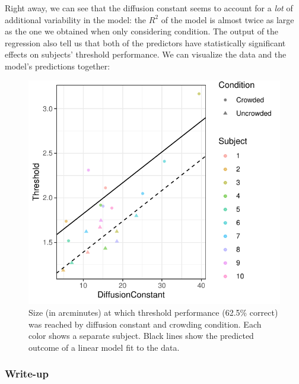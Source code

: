 \documentclass[
]{article}
\begin{document}
\normalsize

Right away, we can see that the diffusion constant seems to account for
a \emph{lot} of additional variability in the model: the \(R^2\) of the
model is almost twice as large as the one we obtained when only
considering condition. The output of the regression also tell us that
both of the predictors have statistically significant effects on
subjects' threshold performance. We can visualize the data and the
model's predictions together:

\footnotesize

\begin{figure}

{\centering \includegraphics{tutorial_files/figure-latex/unnamed-chunk-15-1} 

}

\caption{Size (in arcminutes) at which threshold performance (62.5\% correct) was reached by diffusion constant and crowding condition. Each color shows a separate subject. Black lines show the predicted outcome of a linear model fit to the data.}\label{fig:unnamed-chunk-15}
\end{figure}

\normalsize

\hypertarget{write-up}{%
\subsubsection{Write-up}\label{write-up}}
\end{document}
